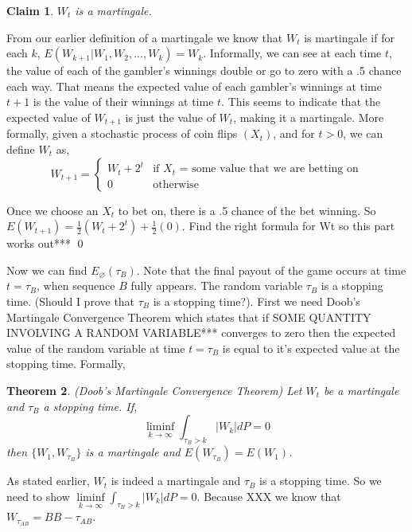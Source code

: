 \documentclass{article}
\newtheorem{theorem}{Theorem}[section]
\newtheorem{claim}[theorem]{Claim}
\numberwithin{mytheorem}{subsection} %
\begin{document}
			\begin{claim}
				$W_t$ is a martingale.
			\end{claim}

			\begin{PROOF}
				From our earlier definition of a martingale we know that $W_t$ is martingale if for each $k$, $E(W_{k+1} | W_1,W_2,...,W_k) = W_k$. Informally, we can see at each time $t$, the value of each of the gambler's winnings double or go to zero with a .5 chance each way. That means the expected value of each gambler's winnings at time $t+1$ is the value of their winnings at time $t$. This seems to indicate that the expected value of $W_{t+1}$ is just the value of $W_t$, making it a martingale. More formally, given a stochastic process of coin flips $(X_t)$, and for $t > 0$, we can define $W_t$ as, 
			    \[ W_{t+1}=\begin{cases} 
			      W_{t} + 2^t & \text{if $X_t$ = some value that we are betting on}\\
			      0 & \text{otherwise} 
				  \end{cases} \]

				 Once we choose an $X_t$ to bet on, there is a .5 chance of the bet winning. So $E(W_{t+1}) = \frac{1}{2}(W_t + 2^t) + \frac{1}{2}(0)$. Find the right formula for Wt so this part works out*** \qed
			\end{PROOF}

			Now we can find $E_{\varnothing}(\tau_{B})$. Note that the final payout of the game occurs at time $t=\tau_{B}$, when sequence $B$ fully appears. The random variable $\tau_B$ is a stopping time. (Should I prove that $\tau_{B}$ is a stopping time?). First we need Doob's Martingale Convergence Theorem which states that if SOME QUANTITY INVOLVING A RANDOM VARIABLE*** converges to zero then the expected value of the random variable at time $t=\tau_B$ is equal to it's expected value at the stopping time. Formally,

			\begin{theorem}(Doob's Martingale Convergence Theorem)
				Let $W_t$ be a martingale and $\tau_B$ a stopping time. If,
				$$\liminf\limits_{k\rightarrow \infty} \int_{\tau_B > k} |W_k|dP = 0$$
				then $\{W_1, W_{\tau_B}\}$ is a martingale and $E(W_{\tau_B}) = E(W_1)$.
			\end{theorem}

			As stated earlier, $W_t$ is indeed a martingale and $\tau_B$ is a stopping time. So we need to show $\liminf\limits_{k\rightarrow \infty} \int_{\tau_B > k} |W_k|dP = 0$. Because XXX we know that $W_{\tau_{AB}} = BB - \tau_{AB}$.
\end{document}
